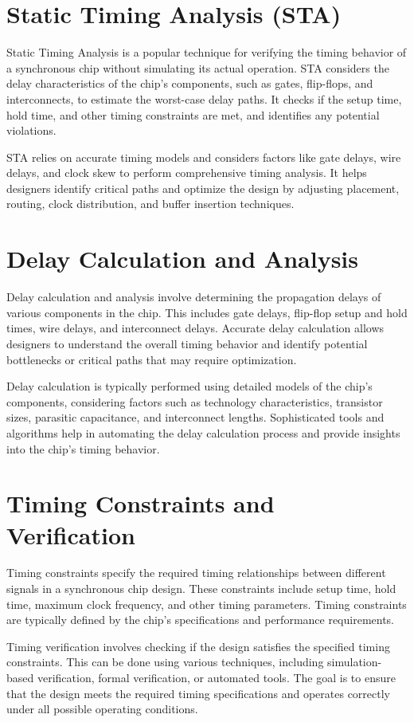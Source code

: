 \documentclass[a4paper,11pt]{report}
\begin{document}
\section{Static Timing Analysis (STA)} 
Static Timing Analysis is a popular technique for verifying the timing behavior of a synchronous chip without simulating its actual operation. STA considers the delay characteristics of the chip's components, such as gates, flip-flops, and interconnects, to estimate the worst-case delay paths. It checks if the setup time, hold time, and other timing constraints are met, and identifies any potential violations.

STA relies on accurate timing models and considers factors like gate delays, wire delays, and clock skew to perform comprehensive timing analysis. It helps designers identify critical paths and optimize the design by adjusting placement, routing, clock distribution, and buffer insertion techniques.
\section{Delay Calculation and Analysis}
Delay calculation and analysis involve determining the propagation delays of various components in the chip. This includes gate delays, flip-flop setup and hold times, wire delays, and interconnect delays. Accurate delay calculation allows designers to understand the overall timing behavior and identify potential bottlenecks or critical paths that may require optimization.

Delay calculation is typically performed using detailed models of the chip's components, considering factors such as technology characteristics, transistor sizes, parasitic capacitance, and interconnect lengths. Sophisticated tools and algorithms help in automating the delay calculation process and provide insights into the chip's timing behavior.
\section{Timing Constraints and Verification}
Timing constraints specify the required timing relationships between different signals in a synchronous chip design. These constraints include setup time, hold time, maximum clock frequency, and other timing parameters. Timing constraints are typically defined by the chip's specifications and performance requirements.

Timing verification involves checking if the design satisfies the specified timing constraints. This can be done using various techniques, including simulation-based verification, formal verification, or automated tools. The goal is to ensure that the design meets the required timing specifications and operates correctly under all possible operating conditions.
\end{document}
